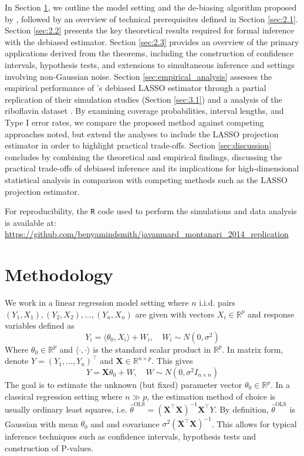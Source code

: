 \documentclass{article}
\begin{document}
In Section \ref{sec:methodology}, we outline the model setting and the de-biasing algorithm proposed by \citet{javanmard14a}, followed by an overview of technical prerequisites defined in Section \ref{sec:2.1}. Section \ref{sec:2.2} presents the key theoretical results required for formal inference with the debiased estimator. Section \ref{sec:2.3} provides an overview of the primary applications derived from the theorems, including the construction of confidence intervals, hypothesis tests, and extensions to simultaneous inference and settings involving non-Gaussian noise. Section \ref{sec:empirical_analysis} assesses the empirical performance of \citet{javanmard14a}'s debiased LASSO estimator through a partial replication of their simulation studies (Section \ref{sec:3.1}) and a analysis of the riboflavin dataset \citep{buhlmann2014high}. By examining coverage probabilities, interval lengths, and Type I error rates, we compare the proposed method against competing approaches noted, but extend the analyses to include the LASSO projection estimator in order to highlight practical trade-offs. Section \ref{sec:discussion} concludes by combining the theoretical and empirical findings, discussing the practical trade-offs of debiased inference and its implications for high-dimensional statistical analysis in comparison with competing methods such as the LASSO projection estimator.

For reproducibility, the \texttt{R} code used to perform the simulations and data analysis is available at:\\\url{https://github.com/benyamindsmith/javanmard_montanari_2014_replication}

\section{Methodology}
\label{sec:methodology}
We work in a linear regression model setting where $n$ i.i.d.  pairs $(Y_1, X_1), (Y_2,X_2), \dots, (Y_n, X_n)$ are given with vectors $X_i \in \mathbb{R}^p$ and response variables defined as
\begin{equation}
    Y_i= \langle\theta_0, X_i\rangle + W_i, \quad W_i \sim N(0, \sigma^2)
    \label{eq:mod_1dim}
\end{equation}
Where $\theta_0\in \mathbb{R}^p$ and $\langle\cdot, \cdot\rangle$ is the standard scalar product in $\mathbb{R}^p$. In matrix form, denote $Y=(Y_1, \dots, Y_n)^\top$ and $\mathbf{X} \in \mathbb{R}^{n\times p}$. This gives
\begin{equation}
    Y = \mathbf{X}\theta_0 + W, \quad W \sim N(0, \sigma^2 I_{n\times n})
    \label{eq:mod_mat_form}
\end{equation}
The goal is to estimate the unknown (but fixed) parameter vector $\theta_0\in \mathbb{R}^p$. In a classical regression setting where $n \gg p$, the estimation method of choice is usually ordinary least squares, i.e. $\hat{\theta}^{\text{OLS}}= (\mathbf{X}^\top\mathbf{X})^{-1}\mathbf{X}^\top Y$. By definition, $\hat{\theta}^{\text{OLS}}$ is Gaussian with mean $\theta_0$ and and covariance $\sigma^2(\mathbf{X}^\top \mathbf{X})^{-1}$. This allows for typical inference techniques such as confidence intervals, hypothesis tests and construction of P-values. 
\end{document}
